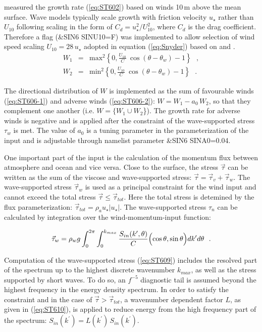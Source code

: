 \citet{art:Dea06} measured the growth rate (\ref{eq:ST602}) 
based on winds 10\,m above the mean surface. Wave models typically scale
growth with friction velocity $u_\star$ rather than $U_{10}$ following scaling
in the form of $C_d=u^2_\star/U^2_{10}$, where $C_d$ is the drag
coefficient. Therefore a flag ({\code \&SIN6 SINU10=F}) was implemented to
allow selection of wind speed scaling $U_{10} = 28\,u_{\star}$ adopted in
equation (\ref{eq:Snyder}) based on \citet{art:Sea81} and \citet{art:KHH84}.
\begin{eqnarray}
W_1 & = & \mathrm{max}^2 \left \{ 0,\frac{U_{10}}{C}\ \cos(\theta-\theta_w)-1
\right \} \:\:\: , \label{eq:ST606-1} \\
W_2 & = & \mathrm{min}^2 \left \{ 0,\frac{U_{10}}{C}\ \cos(\theta-\theta_w)-1
\right \} \:\:\: .\label{eq:ST606-2} 
\end{eqnarray}

\noindent
The directional distribution of $W$ is implemented as the sum of favourable
winds (\ref{eq:ST606-1}) and adverse winds (\ref{eq:ST606-2}):
$W=W_1-a_0\,W_2$, so that they complement one another (i.e. $W=\{W_1\cup
W_2$\}).  The growth rate for adverse winds is negative \citep{art:Dea06} and
is applied after the constraint of the wave-supported stress $\tau_w$ is
met. The value of $a_0$ is a tuning parameter in the parameterization of the
input and is adjustable through namelist parameter {\code \&SIN6 SINA0=0.04}.

One important part of the input is the calculation of the momentum flux
between atmosphere and ocean and vice versa. Close to the surface, the stress
$\vec{\tau}$ can be written as the sum of the viscose and wave-supported
stress: $\vec{\tau} = \vec{\tau}_{v} + \vec{\tau}_{w}$. The wave-supported
stress $ \vec{\tau}_{w}$ is used as a principal constraint for the wind input
and cannot exceed the total stress $\vec{\tau} \le \vec{\tau}_{tot}$.  Here
the total stress is detemined by the flux parameterization:
$\vec{\tau}_{tot}=\rho_a u_\star|u_\star|$. The wave-supported stress $\tau_n$
can be calculated by integration over the wind-momentum-input function:

\begin{equation}\label{eq:ST609}
   \vec{\tau}_w = \rho_w g \int_{0}^{2\pi} \int_{0}^{k_{max}}
   \frac{S_{in}(k^\prime,\theta)}{C} \Bigl (\cos\theta,\sin\theta \Bigr )
   dk^\prime d\theta \:\:\: . 
\end{equation}

\noindent
Computation of the wave-supported stress (\ref{eq:ST609}) includes the
resolved part of the spectrum up to the highest discrete wavenumber $k_{max}$,
as well as the stress supported by short waves. To do so, an $f^{-5}$
diagnostic tail is assumed beyond the highest frequency in the energy density
spectrum. In order to satisfy the constraint and in the case of $\vec{\tau} >
\vec{\tau}_{tot}$, a wavenumber dependent factor $L$, as given in
(\ref{eq:ST610}), is applied to reduce energy from the high frequency part of
the spectrum: $S_{in}(k^\prime)=L(k^\prime)\,S_{in}(k^\prime)$.

